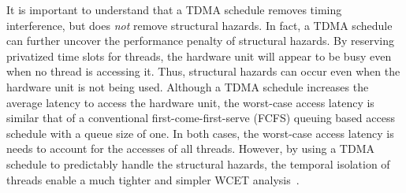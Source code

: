 It is important to understand that a TDMA schedule removes timing interference, but does \emph{not} remove structural hazards.
In fact, a TDMA schedule can further uncover the performance penalty of structural hazards.
By reserving privatized time slots for threads, the hardware unit will appear to be busy even when no thread is accessing it.
Thus, structural hazards can occur even when the hardware unit is not being used.
Although a TDMA schedule increases the average latency to access the hardware unit, the worst-case access latency is similar that of a conventional first-come-first-serve (FCFS) queuing based access schedule with a queue size of one.
In both cases, the worst-case access latency is needs to account for the accesses of all threads.      
However, by using a TDMA schedule to predictably handle the structural hazards, the temporal isolation of threads enable a much tighter and simpler WCET analysis~\cite{Lv:2010:CAI:1935940.1936246}.


